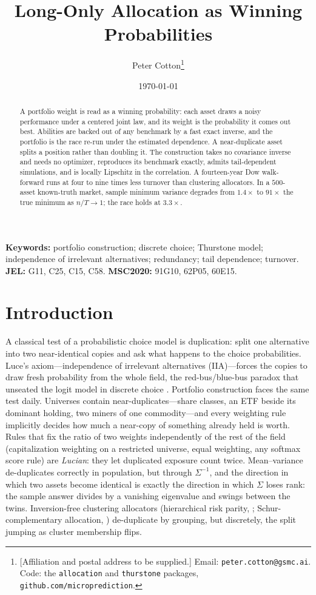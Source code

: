 \documentclass[11pt]{article}
\title{Long-Only Allocation as Winning Probabilities}
\author{Peter Cotton\thanks{%
  [Affiliation and postal address to be supplied.] Email:
  \texttt{peter.cotton@gsmc.ai}. Code: the \texttt{allocation} and
  \texttt{thurstone} packages, \texttt{github.com/microprediction}.}}
\date{\today}
\begin{document}
\maketitle

\begin{abstract}
A portfolio weight is read as a winning probability: each asset draws a noisy
performance under a centered joint law, and its weight is the probability it
comes out best. Abilities are backed out of any benchmark by a fast exact
inverse, and the portfolio is the race re-run under the estimated dependence.
A near-duplicate asset splits a position rather than doubling it. The
construction takes no covariance inverse and needs no optimizer, reproduces
its benchmark exactly, admits tail-dependent simulations, and is locally
Lipschitz in the correlation. A fourteen-year Dow walk-forward runs at four to
nine times less turnover than clustering allocators. In a $500$-asset
known-truth market, sample minimum variance degrades from $1.4\times$ to
$91\times$ the true minimum as $n/T \to 1$; the race holds at $3.3\times$.
\end{abstract}

\noindent\textbf{Keywords:} portfolio construction; discrete choice; Thurstone
model; independence of irrelevant alternatives; redundancy; tail dependence;
turnover.\\
\textbf{JEL:} G11, C25, C15, C58. \quad \textbf{MSC2020:} 91G10, 62P05, 60E15.

\section{Introduction}
\label{sec:intro}

A classical test of a probabilistic choice model is duplication: split one
alternative into two near-identical copies and ask what happens to the choice
probabilities. Luce's axiom---independence of irrelevant alternatives
(IIA)---forces the copies to draw fresh probability from the whole field, the
red-bus/blue-bus paradox that unseated the logit model in discrete choice
\parencite{mcfadden1974}. Portfolio construction faces the same test daily.
Universes contain near-duplicates---share classes, an ETF beside its dominant
holding, two miners of one commodity---and every weighting rule implicitly
decides how much a near-copy of something already held is worth. Rules that fix
the ratio of two weights independently of the rest of the field
(capitalization weighting on a restricted universe, equal weighting, any
softmax score rule) are \emph{Lucian}: they let duplicated exposure count
twice. Mean--variance de-duplicates correctly in population, but through
$\Sigma^{-1}$, and the direction in which two assets become identical is
exactly the direction in which $\Sigma$ loses rank: the sample answer divides
by a vanishing eigenvalue and swings between the twins. Inversion-free
clustering allocators (hierarchical risk parity, \textcite{lopezdeprado2016};
Schur-complementary allocation, \textcite{cotton2024schur}) de-duplicate by
grouping, but discretely, the split jumping as cluster membership flips.
\end{document}
